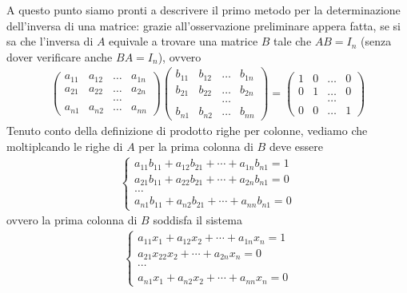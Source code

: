 \documentclass{book}
\theoremstyle{definition}
\theoremstyle{plain}
\begin{document}
A questo punto siamo pronti a descrivere il primo metodo per la
determinazione dell'inversa di una matrice: grazie all'osservazione
preliminare appera fatta, se si sa che l'inversa di $A$ equivale a
trovare una matrice $B$ tale che $AB=I_n$ (senza dover verificare
anche $BA=I_n$), ovvero
\begin{eqnarray*}
  \begin{pmatrix}
    a_{11} & a_{12} & \dots & a_{1n}\\
    a_{21} & a_{22} & \dots & a_{2n}\\
           && \dots \\
    a_{n1} & a_{n2} &\dots & a_{nn}
  \end{pmatrix}
  \begin{pmatrix}
    b_{11} & b_{12} & \dots & b_{1n}\\
    b_{21} & b_{22} & \dots & b_{2n}\\
           && \dots\\
    b_{n1} & b_{n2} & \dots & b_{nn}
  \end{pmatrix}=
  \begin{pmatrix}
    1 & 0 & \dots & 0\\
    0 & 1 & \dots & 0\\
      && \dots\\
    0 & 0 & \dots & 1
  \end{pmatrix}
\end{eqnarray*}
Tenuto conto della definizione di prodotto righe per colonne,
vediamo che moltiplcando le righe di $A$ per la prima colonna di $B$
deve essere
\begin{eqnarray*}
  \begin{cases}
    a_{11}b_{11} +a_{12}b_{21}+\cdots + a_{1n}b_{n1}=1\\
    a_{21}b_{11} +a_{22}b_{21}+\cdots + a_{2n}b_{n1}=0\\
    \dots\\
    a_{n1}b_{11}+a_{n2}b_{21}+\cdots + a_{nn}b_{n1}=0
  \end{cases}
\end{eqnarray*}
ovvero la prima colonna di $B$ soddisfa il sistema
\begin{eqnarray}
  \label{eq:Compinveeproddimatrici9}
  \begin{cases}
    a_{11}x_1+a_{12}x_2+\cdots+a_{1n}x_n=1\\
    a_{21}x_{22}x_2+\cdots +a_{2n}x_n=0\\
    \cdots\\
    a_{n1}x_1+a_{n2}x_2+\cdots+a_{nn}x_n=0
  \end{cases}
\end{eqnarray}
\end{document}
